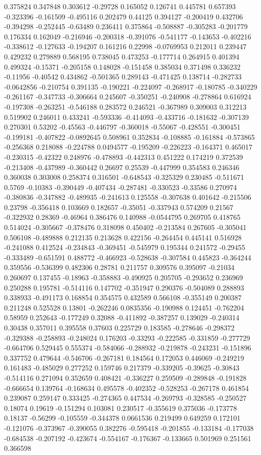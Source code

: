 0.375824 0.347848 0.303612 -0.29728 0.165052 0.126741 0.445781 0.657393 -0.323396 -0.161509 -0.495116 0.202479 0.44125 0.394127 -0.200419 0.432706 -0.394298 -0.252445 -0.63489 0.236411 0.375864 -0.508887 -0.305283 -0.201779 0.176334 0.162049 -0.216946 -0.200318 -0.391076 -0.541177 -0.143653 -0.402216 -0.338612 -0.127633 -0.194207 0.161216 0.22998 -0.0769953 0.212011 0.239447 0.429232 0.279889 0.568195 0.738045 0.473253 -0.177714 0.264915 0.401394 0.499324 -0.15371 -0.205158 0.148028 -0.151458 0.385034 0.371498 0.336232 -0.11956 -0.40542 0.434862 -0.501365 0.289143 -0.471425 0.138714 -0.282733 -0.0642856 -0.210754 0.391135 -0.190221 -0.224097 -0.268917 -0.180785 -0.340229 -0.261167 -0.347733 -0.306664 0.245607 -0.350251 -0.240908 -0.278864 0.616924 -0.197308 -0.263251 -0.546188 0.283572 0.246521 -0.367989 0.309003 0.312213 0.519902 0.246011 0.433241 -0.593336 -0.414093 -0.433716 -0.181632 -0.307139 0.270301 0.53202 -0.45563 -0.446797 -0.360018 -0.55067 -0.428551 -0.300451 -0.199181 -0.407822 -0.0892645 0.508961 0.352834 -0.108885 -0.161884 -0.573865 -0.256368 0.218088 -0.224788 0.0494577 -0.195209 -0.226223 -0.164371 0.465017 -0.230315 -0.42322 0.248976 -0.478893 -0.442313 0.451222 0.174219 0.372539 -0.213408 -0.437989 -0.360442 0.26697 0.25539 -0.447999 0.354583 0.246346 0.360038 0.303008 0.258374 0.316501 -0.648543 -0.325329 0.230485 -0.511671 0.5769 -0.10383 -0.390449 -0.407434 -0.287481 -0.330523 -0.33586 0.270974 -0.380836 -0.347882 -0.489935 -0.241613 0.125558 -0.307638 0.401642 -0.215506 0.23798 -0.356418 0.103669 0.182657 -0.35051 -0.337943 0.574209 0.21567 -0.322932 0.28369 -0.46964 0.386476 0.140988 -0.0544795 0.269705 0.418765 0.514024 -0.305667 -0.378476 0.318098 0.450402 -0.213584 0.267605 -0.305041 0.506108 -0.489888 0.212135 0.213628 0.422156 -0.264454 0.445141 0.516928 -0.241088 0.412524 -0.234843 -0.369451 -0.545979 0.195344 0.241572 -0.29455 -0.333489 -0.651591 0.488772 -0.466923 -0.528638 -0.307584 0.445823 -0.364244 0.359556 -0.536399 0.482306 0.28781 0.211757 0.309576 0.395097 -0.21034 0.260697 0.137455 -0.18963 -0.358883 -0.490925 0.205705 -0.293652 0.236969 0.250288 0.195781 -0.514116 0.147702 -0.351947 0.290376 -0.504089 0.288893 0.338933 -0.491173 0.168854 0.354575 0.432589 0.566108 -0.355149 0.200387 0.211248 0.525528 0.13801 -0.262246 0.0835356 -0.190988 0.124451 -0.762204 0.58959 0.252643 -0.177249 0.32088 -0.411892 -0.387257 0.139029 -0.240314 0.30438 0.357011 0.395558 0.37603 0.225729 0.183585 -0.278646 -0.298372 -0.329388 -0.258893 -0.248024 0.176203 -0.33293 -0.222585 -0.331859 -0.277729 -0.664706 0.529445 0.555374 -0.584066 -0.288932 -0.219878 -0.243231 -0.151896 0.337752 0.479644 -0.546706 -0.267181 0.184564 0.172053 0.446069 -0.249219 0.161483 -0.485029 0.277252 0.159746 0.217379 -0.339205 -0.39625 -0.30843 -0.514116 0.271094 0.352659 0.408421 -0.336227 0.259509 -0.289848 -0.191828 -0.666654 0.139764 -0.168634 0.495578 -0.402352 -0.528253 -0.267178 0.461854 0.239087 0.259147 0.333425 -0.274365 0.447534 -0.269793 -0.328585 -0.250527 0.18074 0.19619 -0.151294 0.103081 0.230517 -0.355619 0.375036 -0.173778 0.18137 -0.56299 -0.105559 -0.344378 0.0661536 0.219499 0.649259 0.172101 -0.121076 -0.373967 -0.390055 0.382276 -0.595418 -0.201855 -0.133184 -0.177038 -0.684538 -0.207192 -0.423674 -0.554167 -0.176367 -0.133665 0.501969 0.251561 0.366598 